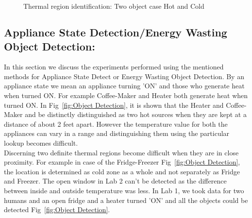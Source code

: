  
 \begin{figure}[!htp]
\begin{minipage}{0.00\textwidth}
\mbox{}
\end{minipage}
\begin{minipage}{0.48\textwidth}
\begin{center}
\scriptsize{
}
\caption{Thermal region identification: Two object case Hot and Cold}
\label{algo:Two Object}
  \end{center}
  \end{minipage}
\end{figure}

    \subsection{Appliance State Detection/Energy Wasting Object Detection:} In this section we discuss the experiments performed using the mentioned methods for Appliance State Detect or Energy Wasting Object Detection. By an appliance state we mean an appliance turning 'ON' and those who generate heat when turned ON. For example Coffee-Maker and Heater both generate heat when turned ON. In Fig~\ref{fig:Object Detection}, it is shown that the Heater and Coffee-Maker and be distinctly distinguished as two hot sources when they are kept at a distance of about 2 feet apart. However the temperature value for both the appliances can vary in a range and distinguishing them using the particular lookup becomes difficult. \\
   \indent Discerning two definite thermal regions become difficult when they are in close proximity. For example in case of the Fridge-Freezer Fig~\ref{fig:Object Detection}, the location is determined as cold zone as a whole and not separately as Fridge and Freezer. The open window in Lab 2 can't be detected as the difference between inside and outside temperature was less. In Lab 1, we took data for two humans and an open fridge and a heater turned 'ON' and all the objects could be detected Fig~\ref{fig:Object Detection}.
   
